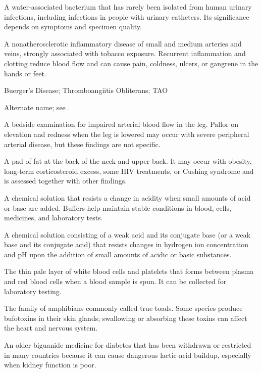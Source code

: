  A water-associated bacterium that has rarely been isolated from human urinary infections, including infections in people with urinary catheters. Its significance depends on symptoms and specimen quality.

 A nonatherosclerotic inflammatory disease of small and medium arteries and veins, strongly associated with tobacco exposure. Recurrent inflammation and clotting reduce blood flow and can cause pain, coldness, ulcers, or gangrene in the hands or feet.

\synonyms
Buerger's Disease; Thromboangiitis Obliterans; TAO

 Alternate name; see .

 A bedside examination for impaired arterial blood flow
in the leg. Pallor on elevation and redness when the leg is lowered may occur
with severe peripheral arterial disease, but these findings are not specific.

 A pad of fat at the back of the neck and upper back. It may occur with obesity, long-term corticosteroid excess, some HIV treatments, or Cushing syndrome and is assessed together with other findings.

 A chemical solution that resists a change in acidity when small amounts of acid or base are added. Buffers help maintain stable conditions in blood, cells, medicines, and laboratory tests.

 A chemical solution consisting of a weak acid and its conjugate base (or a weak base and its conjugate acid) that resists changes in hydrogen ion concentration and pH upon the addition of small amounts of acidic or basic substances.

 The thin pale layer of white blood cells and platelets that forms between plasma and red blood cells when a blood sample is spun. It can be collected for laboratory testing.

 The family of amphibians commonly called true toads. Some species produce bufotoxins in their skin glands; swallowing or absorbing these toxins can affect the heart and nervous system.

 An older biguanide medicine for diabetes that has been withdrawn or restricted in many countries because it can cause dangerous lactic-acid buildup, especially when kidney function is poor.

